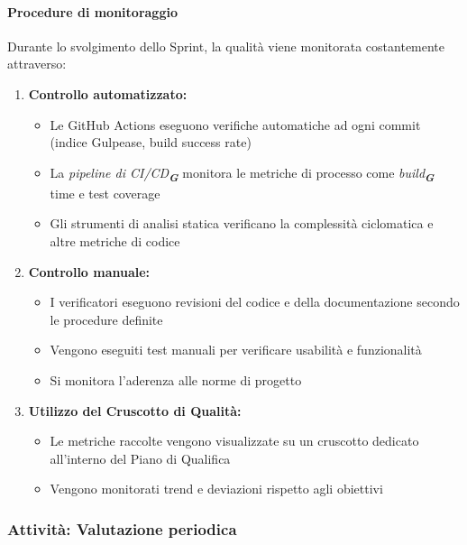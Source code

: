 \documentclass[a4paper,12pt]{article}
\newcommand{\glossario}[1]{\textit{#1}\textsubscript{\textbf{\textit{\textcolor{lightblack}{G}}}}}
\begin{document}
\paragraph{Procedure di monitoraggio}
Durante lo svolgimento dello Sprint, la qualità viene monitorata costantemente attraverso:
\begin{enumerate}
    \item \textbf{Controllo automatizzato:} 
    \begin{itemize}
        \item Le GitHub Actions eseguono verifiche automatiche ad ogni commit (indice Gulpease, build success rate)
        \item La \glossario{pipeline di CI/CD} monitora le metriche di processo come \glossario{build} time e test coverage
        \item Gli strumenti di analisi statica verificano la complessità ciclomatica e altre metriche di codice
    \end{itemize}
    \item \textbf{Controllo manuale:}
    \begin{itemize}
        \item I verificatori eseguono revisioni del codice e della documentazione secondo le procedure definite
        \item Vengono eseguiti test manuali per verificare usabilità e funzionalità
        \item Si monitora l'aderenza alle norme di progetto
    \end{itemize}
    \item \textbf{Utilizzo del Cruscotto di Qualità:}
    \begin{itemize}
        \item Le metriche raccolte vengono visualizzate su un cruscotto dedicato all'interno del Piano di Qualifica
        \item Vengono monitorati trend e deviazioni rispetto agli obiettivi
    \end{itemize}
\end{enumerate}

\subsubsection{Attività: Valutazione periodica}\label{valutazione_periodica}
\end{document}
